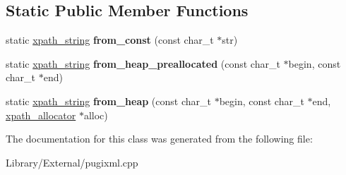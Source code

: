 \subsection*{Static Public Member Functions}
\begin{DoxyCompactItemize}
\item 
\hypertarget{classxpath__string_a6dce01c6b3a949c3c4c886e6be44931e}{}static \hyperlink{classxpath__string}{xpath\+\_\+string} {\bfseries from\+\_\+const} (const char\+\_\+t $\ast$str)\label{classxpath__string_a6dce01c6b3a949c3c4c886e6be44931e}

\item 
\hypertarget{classxpath__string_a37e13c2dc384cac842cee3870e9e9e23}{}static \hyperlink{classxpath__string}{xpath\+\_\+string} {\bfseries from\+\_\+heap\+\_\+preallocated} (const char\+\_\+t $\ast$begin, const char\+\_\+t $\ast$end)\label{classxpath__string_a37e13c2dc384cac842cee3870e9e9e23}

\item 
\hypertarget{classxpath__string_aaf1229b7a7ae918b41bf995df16c8896}{}static \hyperlink{classxpath__string}{xpath\+\_\+string} {\bfseries from\+\_\+heap} (const char\+\_\+t $\ast$begin, const char\+\_\+t $\ast$end, \hyperlink{classxpath__allocator}{xpath\+\_\+allocator} $\ast$alloc)\label{classxpath__string_aaf1229b7a7ae918b41bf995df16c8896}

\end{DoxyCompactItemize}


The documentation for this class was generated from the following file\+:\begin{DoxyCompactItemize}
\item 
Library/\+External/pugixml.\+cpp\end{DoxyCompactItemize}
